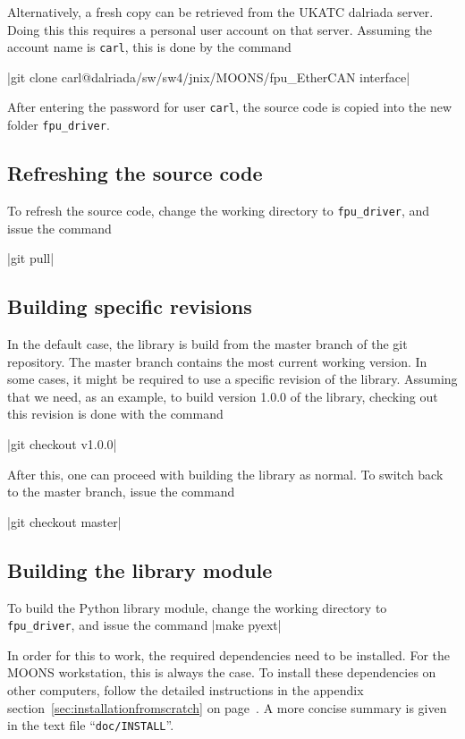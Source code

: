 \documentclass[11pt,a4paper]{scrartcl}
\begin{document}
Alternatively, a fresh copy can be retrieved from the UKATC dalriada
server. Doing this this requires a personal user account on that
server. Assuming the account name is \texttt{carl}, this is done by
the command

|git clone carl@dalriada/sw/sw4/jnix/MOONS/fpu_EtherCAN interface|

After entering the password for user \texttt{carl}, the
source code is copied into the new folder \texttt{fpu\_driver}.

\subsection{Refreshing the source code}
To refresh the source code, change the
working directory to \texttt{fpu\_driver},
and issue the command

|git pull|


\subsection{Building specific revisions}
In the default case, the library is build from
the master branch of the git repository.
The master branch contains the most current
working version.
In some cases, it might be required to
use a specific revision of the library.
Assuming that we need, as an example,
to build version 1.0.0 of the library,
checking out this revision is done with the
command

|git checkout v1.0.0|

After this, one can proceed with building the library as normal. To
switch back to the master branch, issue the command

|git checkout master|


\subsection{Building the library module}
To build the Python library module,
change the working directory to \texttt{fpu\_driver},
and issue the command |make pyext|

In order for this to work, the required dependencies need to be
installed. For the MOONS workstation, this is always the case. To
install these dependencies on other computers, follow the detailed
instructions in the appendix section~\ref{sec:installationfromscratch}
on page~\pageref{sec:installationfromscratch}.  A more concise summary
is given in the text file ``\texttt{doc/INSTALL}''.
\end{document}
